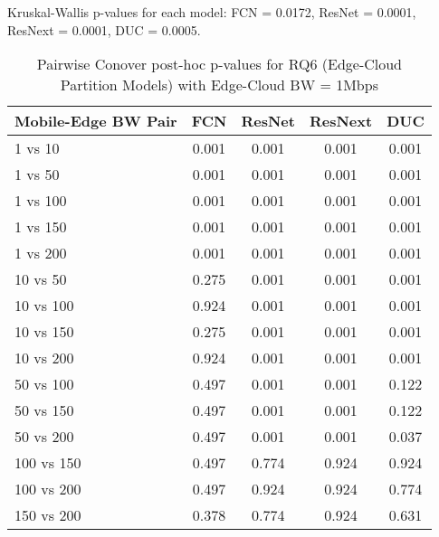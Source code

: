 \begin{table}[h]
\centering
\caption{Pairwise Conover post-hoc p-values for RQ6 (Edge-Cloud Partition Models) with Edge-Cloud BW = 1Mbps}
\label{tab:conover_edge_cloud_partition_ec1}
\smallskip
Kruskal-Wallis p-values for each model: FCN = 0.0172, ResNet = 0.0001, ResNext = 0.0001, DUC = 0.0005.

\begin{tabular}{lcccc}
\toprule
Mobile-Edge BW Pair & FCN & ResNet & ResNext & DUC \\
\midrule
1 vs 10 & 0.001 & 0.001 & 0.001 & 0.001 \\
1 vs 50 & 0.001 & 0.001 & 0.001 & 0.001 \\
1 vs 100 & 0.001 & 0.001 & 0.001 & 0.001 \\
1 vs 150 & 0.001 & 0.001 & 0.001 & 0.001 \\
1 vs 200 & 0.001 & 0.001 & 0.001 & 0.001 \\
10 vs 50 & 0.275 & 0.001 & 0.001 & 0.001 \\
10 vs 100 & 0.924 & 0.001 & 0.001 & 0.001 \\
10 vs 150 & 0.275 & 0.001 & 0.001 & 0.001 \\
10 vs 200 & 0.924 & 0.001 & 0.001 & 0.001 \\
50 vs 100 & 0.497 & 0.001 & 0.001 & 0.122 \\
50 vs 150 & 0.497 & 0.001 & 0.001 & 0.122 \\
50 vs 200 & 0.497 & 0.001 & 0.001 & 0.037 \\
100 vs 150 & 0.497 & 0.774 & 0.924 & 0.924 \\
100 vs 200 & 0.497 & 0.924 & 0.924 & 0.774 \\
150 vs 200 & 0.378 & 0.774 & 0.924 & 0.631 \\
\bottomrule
\end{tabular}
\end{table}

